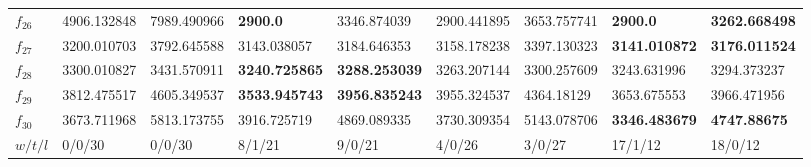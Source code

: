 \begin{table*}[t]
\begin{tabular}{|p{0.8cm}|p{1.6cm}|p{1.6cm}|p{1.6cm}|p{1.6cm}|p{1.6cm}|p{1.6cm}|p{1.6cm}|p{1.6cm}|}
$f_{26}$  & 4906.132848 & 7989.490966 & \textbf{2900.0} & 3346.874039 & 2900.441895 & 3653.757741 & \textbf{2900.0} & \textbf{3262.668498} \\ 
$f_{27}$  & 3200.010703 & 3792.645588 & 3143.038057 & 3184.646353 & 3158.178238 & 3397.130323 & \textbf{3141.010872} & \textbf{3176.011524} \\ 
$f_{28}$  & 3300.010827 & 3431.570911 & \textbf{3240.725865} & \textbf{3288.253039} & 3263.207144 & 3300.257609 & 3243.631996 & 3294.373237 \\ 
$f_{29}$  & 3812.475517 & 4605.349537 & \textbf{3533.945743} & \textbf{3956.835243} & 3955.324537 & 4364.18129 & 3653.675553 & 3966.471956 \\ 
$f_{30}$  & 3673.711968 & 5813.173755 & 3916.725719 & 4869.089335 & 3730.309354 & 5143.078706 & \textbf{3346.483679} & \textbf{4747.88675} \\ 
\hline
$w/t/l$  & 0/0/30 & 0/0/30 & 8/1/21 & 9/0/21 & 4/0/26 & 3/0/27 & 17/1/12 & 18/0/12 \\
\hline
\end{tabular}
\end{table*}

